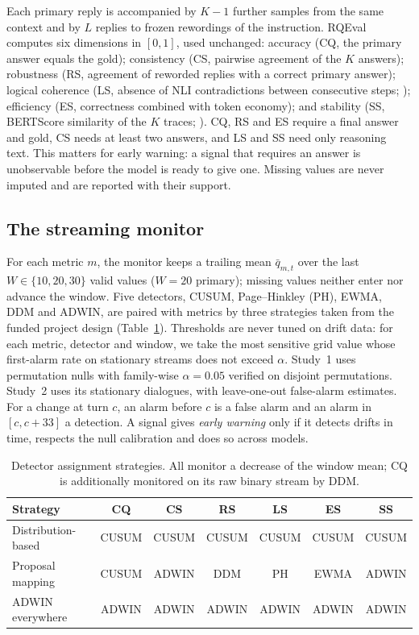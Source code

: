 Each primary reply is accompanied by $K-1$ further samples from the same
context and by $L$ replies to frozen rewordings of the instruction. RQEval
\citep{rqeval2026} computes six dimensions in $[0,1]$, used unchanged:
accuracy (CQ, the primary answer equals the gold); consistency (CS, pairwise
agreement of the $K$ answers); robustness (RS, agreement of reworded replies
with a correct primary answer); logical coherence (LS, absence of NLI
contradictions between consecutive steps; \citealp{he2021deberta}); efficiency
(ES, correctness combined with token economy); and stability (SS, BERTScore
similarity of the $K$ traces; \citealp{zhang2020bertscore}). CQ, RS and ES
require a final answer and gold, CS needs at least two answers, and LS and SS
need only reasoning text. This matters for early warning: a signal that
requires an answer is unobservable before the model is ready to give one.
Missing values are never imputed and are reported with their support.

\subsection{The streaming monitor}

For each metric $m$, the monitor keeps a trailing mean $\bar q_{m,t}$ over the
last $W\in\{10,20,30\}$ valid values ($W=20$ primary); missing values neither
enter nor advance the window. Five detectors, CUSUM, Page--Hinkley (PH), EWMA,
DDM and ADWIN, are paired with metrics by three strategies taken from the
funded project design (Table~\ref{tab:strategies}). Thresholds are never tuned
on drift data: for each metric, detector and window, we take the most
sensitive grid value whose first-alarm rate on stationary streams does not
exceed $\alpha$. Study~1 uses permutation nulls with family-wise
$\alpha=0.05$ verified on disjoint permutations. Study~2 uses its stationary
dialogues, with leave-one-out false-alarm estimates. For a change at turn $c$,
an alarm before $c$ is a false alarm and an alarm in $[c, c+33]$ a detection.
A signal gives \emph{early warning} only if it detects drifts in time, respects
the null calibration and does so across models.

\begin{table}[!htbp]
\centering
\caption{Detector assignment strategies. All monitor a decrease of the window
mean; CQ is additionally monitored on its raw binary stream by DDM.}
\label{tab:strategies}
\footnotesize
\setlength{\tabcolsep}{4pt}
\begin{tabular}{lcccccc}
\toprule
Strategy & CQ & CS & RS & LS & ES & SS\\
\midrule
Distribution-based & CUSUM & CUSUM & CUSUM & CUSUM & CUSUM & CUSUM\\
Proposal mapping & CUSUM & ADWIN & DDM & PH & EWMA & ADWIN\\
ADWIN everywhere & ADWIN & ADWIN & ADWIN & ADWIN & ADWIN & ADWIN\\
\bottomrule
\end{tabular}
\end{table}

